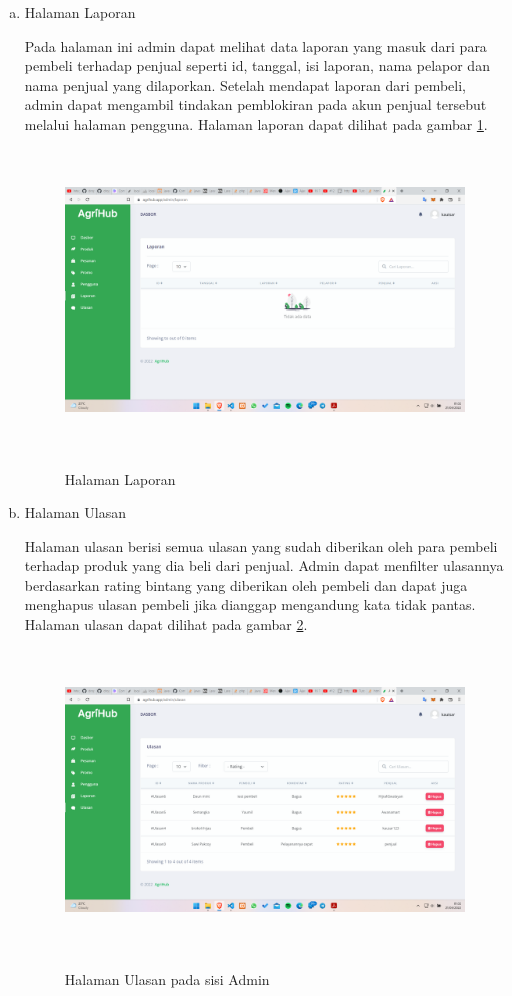 \begin{enumerate}
\begin{enumerate}[a.]
		\item Halaman Laporan
		\par Pada halaman ini admin dapat melihat data laporan yang masuk dari para pembeli terhadap penjual seperti id, tanggal, isi laporan, nama pelapor dan nama penjual yang dilaporkan. Setelah mendapat laporan dari pembeli, admin dapat mengambil tindakan pemblokiran pada akun penjual tersebut melalui halaman pengguna. Halaman laporan dapat dilihat pada gambar \ref*{laporan}.
		\begin{figure}[H]
			\centering
			{\includegraphics [width = 13.3cm, height= 8cm]{gambar/admin/laporan}}
			\caption{Halaman Laporan}
			\label{laporan}
		\end{figure}

		\item Halaman Ulasan
		\par Halaman ulasan berisi semua ulasan yang sudah diberikan oleh para pembeli terhadap produk yang dia beli dari penjual. Admin dapat menfilter ulasannya berdasarkan rating bintang yang diberikan oleh pembeli dan dapat juga menghapus ulasan pembeli jika dianggap mengandung kata tidak pantas. Halaman ulasan dapat dilihat pada gambar \ref*{ulasan_admin}.
		\begin{figure}[H]
			\centering
			{\includegraphics [width = 13.3cm, height= 8cm]{gambar/admin/ulasan_admin}}
			\caption{Halaman Ulasan pada sisi Admin}
			\label{ulasan_admin}
		\end{figure}
	\end{enumerate}


\end{enumerate}
